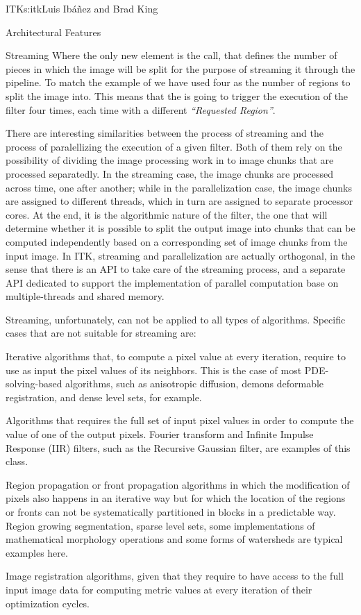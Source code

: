 \begin{aosachapter}{ITK}{s:itk}{Luis Ib\'{a}\~{n}ez and Brad King}
\begin{aosasect1}{Architectural Features}
\begin{aosasect2}{Streaming}
Where the only new element is the  call,
that defines the number of pieces in which the image will be split for the
purpose of streaming it through the pipeline. To match the example of
 we have used  four as the number of regions to
split the image into. This means that the  is going to trigger the
execution of the  filter four times, each time with a different
\emph{``Requested Region''}.

There are interesting similarities between the process of streaming
and the process of paralellizing the execution of a given filter. Both
of them rely on the possibility of dividing the image processing work
in to image chunks that are processed separatedly. In the streaming
case, the image chunks are processed across time, one after another;
while in the parallelization case, the image chunks are assigned to
different threads, which in turn are assigned to separate processor
cores. At the end, it is the algorithmic nature of the filter, the
one that will determine whether it is possible to split the output
image into chunks that can be computed independently based on a
corresponding set of image chunks from the input image. In ITK,
streaming and parallelization are actually orthogonal, in the sense
that there is an API to take care of the streaming process, and a
separate API dedicated to support the implementation of parallel
computation base on multiple-threads and shared memory.

Streaming, unfortunately, can not be applied to all types of algorithms. Specific
cases that are not suitable for streaming are:

\begin{aosaitemize}
\item Iterative algorithms that, to compute a pixel value at every iteration,
require to use as input the pixel values of its neighbors. This is the case of
most PDE-solving-based algorithms, such as anisotropic diffusion, demons
deformable registration, and dense level sets, for example.
\item Algorithms that requires the full set of input pixel values in order to
compute the value of one of the output pixels. Fourier transform and Infinite
Impulse Response (IIR) filters, such as the Recursive Gaussian filter, are
examples of this class.
\item Region propagation or front propagation algorithms in which the
modification of pixels also happens in an iterative way but for which the
location of the regions or fronts can not be systematically partitioned in
blocks in a predictable way. Region growing segmentation, sparse level sets,
some implementations of mathematical morphology operations and some forms of
watersheds are typical examples here.
\item Image registration algorithms, given that they require to have access to
the full input image data for computing metric values at every iteration of
their optimization cycles.
\end{aosaitemize}


\end{aosasect2}
\end{aosasect1}
\end{aosachapter}
